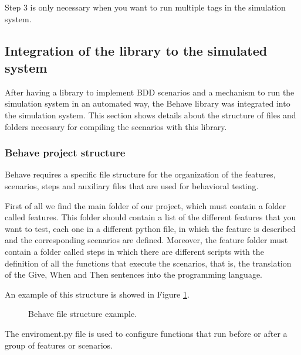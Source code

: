\documentclass[journal]{IEEEtran}	%
\begin{document}
Step 3 is only necessary when you want to run multiple tags in the simulation system.

\subsection{Integration of the library to the simulated system}

After having a library to implement BDD scenarios and a mechanism to run the simulation system in an automated way, the Behave library was integrated into the simulation system. This section shows details about the structure of files and folders necessary for compiling the scenarios with this library.\\

\subsubsection{Behave project structure}

Behave requires a specific file structure for the organization of the features, scenarios, steps and auxiliary files that are used for behavioral testing.

First of all we find the main folder of our project, which must contain a folder called features. This folder should contain a list of the different features that you want to test, each one in a different python file, in which the feature is described and the corresponding scenarios are defined. Moreover, the feature folder must contain a folder called steps in which there are different scripts with the definition of all the functions that execute the scenarios, that is, the translation of the Give, When and Then sentences into the programming language.

An example of this structure is showed in Figure \ref{fig:dirtree1}.

\begin{figure}[H]
    \caption{Behave file structure example.}
    \label{fig:dirtree1}
\end{figure}

The enviroment.py file is used to configure functions that run before or after a group of features or scenarios.
\end{document}
